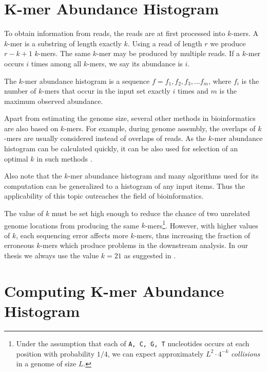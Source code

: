\section{K-mer Abundance Histogram}
\label{sec:histogram}
To obtain information from reads, the reads are at first processed into $k$-mers. 
A $k$-mer is a substring of length exactly $k$. Using a read of length $r$ we produce 
$r-k+1$ $k$-mers. The same $k$-mer may be produced by multiple reads. If a $k$-mer occurs $i$ times
among all $k$-mers, we say its abundance is $i$. 

\begin{definition}
The $k$-mer abundance histogram is a sequence $f = f_1, f_2, f_3, \dots f_m$, 
where $f_i$ is the number of $k$-mers that occur in the input set exactly $i$ times 
and $m$ is the maximum observed abundance.
\end{definition}

Apart from estimating the genome size, several other methods in bioinformatics are also 
based on $k$-mers. For example, during genome assembly, the overlaps of $k$-mers are usually
considered instead of overlaps of reads. As the $k$-mer abundance histogram can be calculated
quickly, it can be also used for selection of an optimal $k$ in such methods \cite{Chikhi2013}.

Also note that the $k$-mer abundance histogram and many algorithms used for its computation
can be generalized to a histogram of any input items. Thus the applicability of this topic
outreaches the field of bioinformatics. 

\medskip

The value of $k$ must be set high enough to reduce the chance of two unrelated genome locations from 
producing the same $k$-mers\footnote{Under the assumption that each of \texttt{A, C, G, T}
nucleotides occurs at each position with probability $1/4$, we can expect approximately
$L^2 \cdot 4^{-k}$ \textit{collisions} in a genome of size $L$.}. However, with higher values of $k$,
each sequencing error affects more $k$-mers, thus increasing the fraction of erroneous $k$-mers
which produce problems in the downstream analysis. In our thesis we always use
the value $k=21$ as suggested in \cite{Williams2013, Hozza2015}.

\section{Computing K-mer Abundance Histogram}
\label{sec:algorithms}

